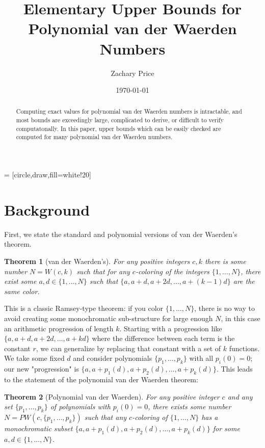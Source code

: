 \documentclass[a4paper]{amsproc}
\title{Elementary Upper Bounds for Polynomial van der Waerden Numbers}
\author[Price]{Zachary Price}
\date{\today}
\theoremstyle{plain}
\theoremstyle{named}
\newtheorem*{namedtheorem}{Theorem}
\begin{document}
 = [circle,draw,fill=white!20]

\vspace{18mm} \setcounter{page}{1} \thispagestyle{empty}

\begin{abstract}
  Computing exact values for polynomial van der Waerden numbers is intractable,
  and most bounds are exceedingly large, complicated to derive, or difficult to verify computatonally.
  In this paper, upper bounds which can be easily checked are computed for many polynomial van der Waerden numbers.
\end{abstract}

\maketitle

\section{Background}

First, we state the standard and polynomial versions of van der Waerden's theorem.

\begin{namedtheorem}[van der Waerden's]
  For any positive integers $c,k$ there is some number $N=W(c,k)$ such that for any $c$-coloring of the integers $\{1,\ldots,N\}$, there
  exist some $a,d\in \{1,\ldots,N\}$ such that $\{a, a+d, a+2d, \ldots, a+(k-1)d\}$ are the same color.
\end{namedtheorem}

This is a classic Ramsey-type theorem: if you color $\{1,\ldots,N\}$, there is no way to avoid creating some monochromatic sub-structure for large enough $N$, in this case an arithmetic progression of length $k$.
Starting with a progression like $\{a, a+d, a+2d,\ldots, a+kd\}$ where the difference between each term is the constant $r$, we can generalize by replacing that constant with a set of $k$ functions.
We take some fixed $d$ and consider polynomials $\{p_1,\ldots,p_k\}$ with all $p_i(0)=0$; our new "progression" is $\{a, a+p_1(d), a+p_2(d),\ldots, a+p_k(d)\}$.
This leads to the statement of the polynomial van der Waerden theorem:

\begin{namedtheorem}[Polynomial van der Waerden]
  For any positive integer $c$ and any set $\{p_1,\ldots,p_k\}$ of polynomials with $p_i(0)=0$, there exists some number $N=PW(c,\{p_1,\ldots,p_k\})$ such that any $c$-coloring of $\{1,\ldots,N\}$ has a monochromatic subset ${\{a, a+p_1(d), a+p_2(d),\ldots, a+p_k(d)\}}$ for some $a,d\in\{1,\ldots,N\}$.
\end{namedtheorem}
\end{document}
